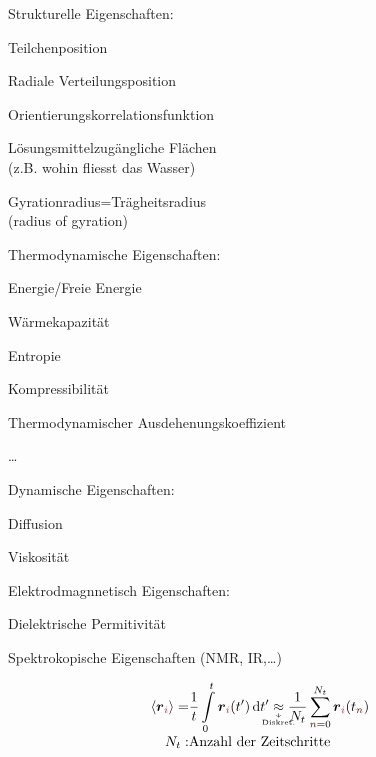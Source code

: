\begin{sectionbox}[Überblick]\nospacing
 \begin{circlelist}
    \item Strukturelle Eigenschaften:
    \begin{numberlist}
        \item Teilchenposition
        \item Radiale Verteilungsposition
        \item Orientierungskorrelationsfunktion
        \item Lösungsmittelzugängliche Flächen\\ (z.B. wohin fliesst das Wasser)
        \item Gyrationradius=Trägheitsradius\\ (radius of gyration)
    \end{numberlist}
    \item Thermodynamische Eigenschaften:
    \begin{numberlist}
        \item Energie/Freie Energie
        \item Wärmekapazität
        \item Entropie
        \item Kompressibilität
        \item Thermodynamischer Ausdehenungskoeffizient
        \item \ldots
    \end{numberlist}
    \item Dynamische Eigenschaften:
    \begin{numberlist}
        \item Diffusion
        \item Viskosität
    \end{numberlist}
    \item Elektrodmagnnetisch Eigenschaften:
    \begin{numberlist}
        \item Dielektrische Permitivität
        \item Spektrokopische Eigenschaften (NMR, IR,\ldots)
    \end{numberlist}
 \end{circlelist}
\end{sectionbox}
\begin{sectionbox}\nospacing
  \begin{align}
    \obs{\rveci}=&\frac{1}{t}\int\limits_{0}^t\rveci(t')\diff t'\bda{\approx}{\normalfont{Diskret.}}\frac{1}{N_{t}}\sum_{\idxn=0}^{N_{t}}\rveci(t_{\idxn})\nalign\nonumber
    N_{t}:&\text{Anzahl der Zeitschritte}
  \end{align}
\end{sectionbox}
